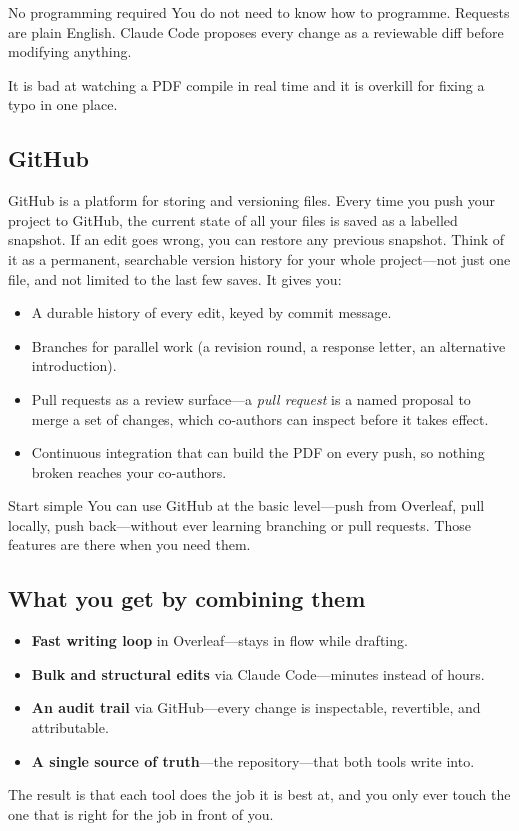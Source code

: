 \begin{tipbox}{No programming required}
You do not need to know how to programme. Requests are plain English. Claude Code proposes every change as a reviewable diff before modifying anything.
\end{tipbox}

It is bad at watching a PDF compile in real time and it is overkill for fixing a typo in one place.

\subsection{GitHub}
GitHub is a platform for storing and versioning files. Every time you push your project to GitHub, the current state of all your files is saved as a labelled snapshot. If an edit goes wrong, you can restore any previous snapshot. Think of it as a permanent, searchable version history for your whole project---not just one file, and not limited to the last few saves. It gives you:
\begin{itemize}[leftmargin=*]
  \item A durable history of every edit, keyed by commit message.
  \item Branches for parallel work (a revision round, a response letter, an alternative introduction).
  \item Pull requests as a review surface---a \textit{pull request} is a named proposal to merge a set of changes, which co-authors can inspect before it takes effect.
  \item Continuous integration that can build the PDF on every push, so nothing broken reaches your co-authors.
\end{itemize}

\begin{tipbox}{Start simple}
You can use GitHub at the basic level---push from Overleaf, pull locally, push back---without ever learning branching or pull requests. Those features are there when you need them.
\end{tipbox}

\subsection{What you get by combining them}
\begin{itemize}[leftmargin=*]
  \item \textbf{Fast writing loop} in Overleaf---stays in flow while drafting.
  \item \textbf{Bulk and structural edits} via Claude Code---minutes instead of hours.
  \item \textbf{An audit trail} via GitHub---every change is inspectable, revertible, and attributable.
  \item \textbf{A single source of truth}---the repository---that both tools write into.
\end{itemize}

The result is that each tool does the job it is best at, and you only ever touch the one that is right for the job in front of you.
